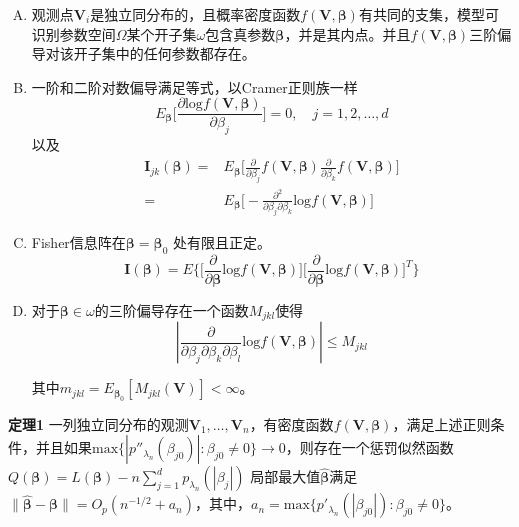 ﻿\documentclass[hyperref,12pt]{ctexart}
\begin{document}
\begin{enumerate}[(A)]
\item 观测点$\mathbf{V}_i$是独立同分布的，且概率密度函数$f(\mathbf{V}, \boldsymbol{\beta})$有共同的支集，模型可识别参数空间$\Omega$某个开子集$\omega$包含真参数$\boldsymbol{\beta}$，并是其内点。并且$f(\mathbf{V}, \boldsymbol{\beta})$三阶偏导对该开子集中的任何参数都存在。

\item 一阶和二阶对数偏导满足等式，以Cramer正则族一样
\[
E_{\boldsymbol{\beta}}\Big[ \frac{\partial \text{log}f(\mathbf{V}, \boldsymbol{\beta})}{\partial \beta_j}\Big] =  0, \quad j = 1, 2, \ldots, d
\]
以及
\[
\begin{split}
\mathbf{I}_{jk}(\boldsymbol{\beta}) = & E_{\boldsymbol{\beta}}\Big[ \frac{\partial}{\partial \beta_j} f(\mathbf{V}, \boldsymbol{\beta})\frac{\partial}{\partial \beta_k} f(\mathbf{V}, \boldsymbol{\beta})\Big] \\
= & E_{\boldsymbol{\beta}}\Big[- \frac{\partial^2 }{\partial \beta_j \partial \beta_k} \text{log}f(\mathbf{V}, \boldsymbol{\beta})\Big]
\end{split}
\]

\item Fisher信息阵在$\boldsymbol{\beta} = \boldsymbol{\beta}_0$ 处有限且正定。
\[
\mathbf{I}(\boldsymbol{\beta}) = E \Big\{ \Big[\frac{\partial}{\partial \boldsymbol{\beta}} \text{log}f(\mathbf{V}, \boldsymbol{\beta})\Big]\Big[\frac{\partial}{\partial \boldsymbol{\beta}} \text{log}f(\mathbf{V}, \boldsymbol{\beta})\Big]^T\Big\}
\]

\item 对于$\boldsymbol{\beta} \in \omega$的三阶偏导存在一个函数$M_{jkl}$使得
\[
|\frac{\partial}{\partial \beta_j \partial \beta_k \partial \beta_l} \text{log}f(\mathbf{V}, \boldsymbol{\beta})| \leq M_{jkl}
\]

其中$m_{jkl} = E_{\boldsymbol{\beta}_0}[M_{jkl}(\mathbf{V})] < \infty$。
\end{enumerate}

\textbf{定理1} \quad 一列独立同分布的观测$\mathbf{V}_1, \ldots, \mathbf{V}_n$，有密度函数$f(\mathbf{V}, \boldsymbol{\beta})$，满足上述正则条件，并且如果$\text{max}\{|p''_{\lambda_n}(\beta_{j0})|:\beta_{j0} \neq 0 \} \rightarrow 0$，则存在一个惩罚似然函数$Q(\boldsymbol{\beta}) = L(\boldsymbol{\beta}) - n\sum^d_{j = 1}p_{\lambda_n}(|\beta_j|)$ 局部最大值$\hat{\boldsymbol{\beta}}$满足$\| \hat{\boldsymbol{\beta}} - \boldsymbol{\beta}\| = O_p(n^{-1/2} + a_n)$，其中，$a_n = \text{max}\{p'_{\lambda_n}(|\beta_{j0}|): \beta_{j0} \neq 0\}$。
\end{document}
